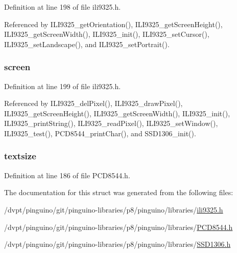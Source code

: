Definition at line 198 of file ili9325.\-h.



Referenced by I\-L\-I9325\-\_\-get\-Orientation(), I\-L\-I9325\-\_\-get\-Screen\-Height(), I\-L\-I9325\-\_\-get\-Screen\-Width(), I\-L\-I9325\-\_\-init(), I\-L\-I9325\-\_\-set\-Cursor(), I\-L\-I9325\-\_\-set\-Landscape(), and I\-L\-I9325\-\_\-set\-Portrait().

\hypertarget{structlcd__t_a170959ba8d59769ce0c2ceebd8919217}{
\subsubsection[{screen}]{ screen}}\label{structlcd__t_a170959ba8d59769ce0c2ceebd8919217}


Definition at line 199 of file ili9325.\-h.



Referenced by I\-L\-I9325\-\_\-del\-Pixel(), I\-L\-I9325\-\_\-draw\-Pixel(), I\-L\-I9325\-\_\-get\-Screen\-Height(), I\-L\-I9325\-\_\-get\-Screen\-Width(), I\-L\-I9325\-\_\-init(), I\-L\-I9325\-\_\-print\-String(), I\-L\-I9325\-\_\-read\-Pixel(), I\-L\-I9325\-\_\-set\-Window(), I\-L\-I9325\-\_\-test(), P\-C\-D8544\-\_\-print\-Char(), and S\-S\-D1306\-\_\-init().

\hypertarget{structlcd__t_a820362b03a1bac292c88f1ab216d3934}{
\subsubsection[{textsize}]{ textsize}}\label{structlcd__t_a820362b03a1bac292c88f1ab216d3934}


Definition at line 186 of file P\-C\-D8544.\-h.



The documentation for this struct was generated from the following files\-:\begin{DoxyCompactItemize}
\item 
/dvpt/pinguino/git/pinguino-\/libraries/p8/pinguino/libraries/\hyperlink{ili9325_8h}{ili9325.\-h}\item 
/dvpt/pinguino/git/pinguino-\/libraries/p8/pinguino/libraries/\hyperlink{p8_2pinguino_2libraries_2_p_c_d8544_8h}{P\-C\-D8544.\-h}\item 
/dvpt/pinguino/git/pinguino-\/libraries/p8/pinguino/libraries/\hyperlink{p8_2pinguino_2libraries_2_s_s_d1306_8h}{S\-S\-D1306.\-h}\end{DoxyCompactItemize}
